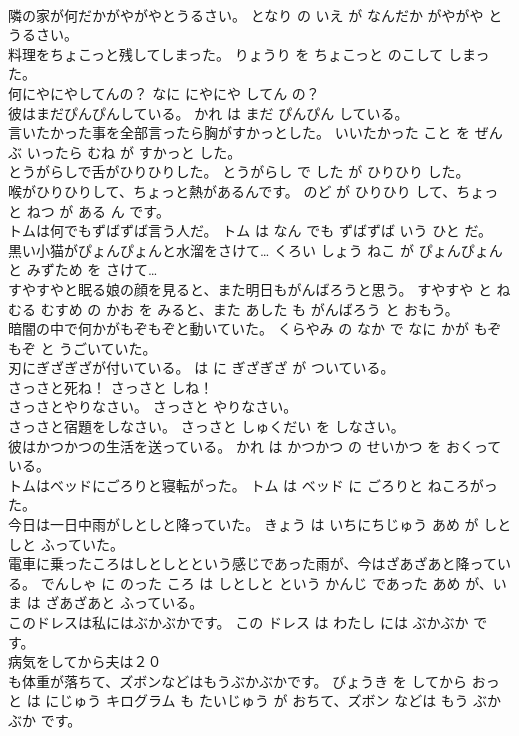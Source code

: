 \documentclass[8pt]{extreport}
\begin{document}
\begin{CJK}{UTF8}{min}
\\	隣の家が何だかがやがやとうるさい。	となり の いえ が なんだか がやがや と うるさい。	
\\	料理をちょこっと残してしまった。	りょうり を ちょこっと のこして しまった。	
\\	何にやにやしてんの？	なに にやにや してん の？	
\\	彼はまだぴんぴんしている。	かれ は まだ ぴんぴん している。	
\\	言いたかった事を全部言ったら胸がすかっとした。	いいたかった こと を ぜんぶ いったら むね が すかっと した。	
\\	とうがらしで舌がひりひりした。	とうがらし で した が ひりひり した。	
\\	喉がひりひりして、ちょっと熱があるんです。	のど が ひりひり して、ちょっと ねつ が ある ん です。	
\\	トムは何でもずばずば言う人だ。	トム は なん でも ずばずば いう ひと だ。	
\\	黒い小猫がぴょんぴょんと水溜をさけて…	くろい しょう ねこ が ぴょんぴょん と みずため を さけて…	
\\	すやすやと眠る娘の顔を見ると、また明日もがんばろうと思う。	すやすや と ねむる むすめ の かお を みると、また あした も がんばろう と おもう。	
\\	暗闇の中で何かがもぞもぞと動いていた。	くらやみ の なか で なに かが もぞもぞ と うごいていた。	
\\	刃にぎざぎざが付いている。	は に ぎざぎざ が ついている。	
\\	さっさと死ね！	さっさと しね！	
\\	さっさとやりなさい。	さっさと やりなさい。	
\\	さっさと宿題をしなさい。	さっさと しゅくだい を しなさい。	
\\	彼はかつかつの生活を送っている。	かれ は かつかつ の せいかつ を おくっている。	
\\	トムはベッドにごろりと寝転がった。	トム は ベッド に ごろりと ねころがった。	
\\	今日は一日中雨がしとしと降っていた。	きょう は いちにちじゅう あめ が しとしと ふっていた。	
\\	電車に乗ったころはしとしとという感じであった雨が、今はざあざあと降っている。	でんしゃ に のった ころ は しとしと という かんじ であった あめ が、いま は ざあざあと ふっている。	
\\	このドレスは私にはぶかぶかです。	この ドレス は わたし には ぶかぶか です。	
\\	病気をしてから夫は２０
\\	も体重が落ちて、ズボンなどはもうぶかぶかです。	びょうき を してから おっと は にじゅう キログラム も たいじゅう が おちて、ズボン などは もう ぶかぶか です。	

\end{CJK}
\end{document}
